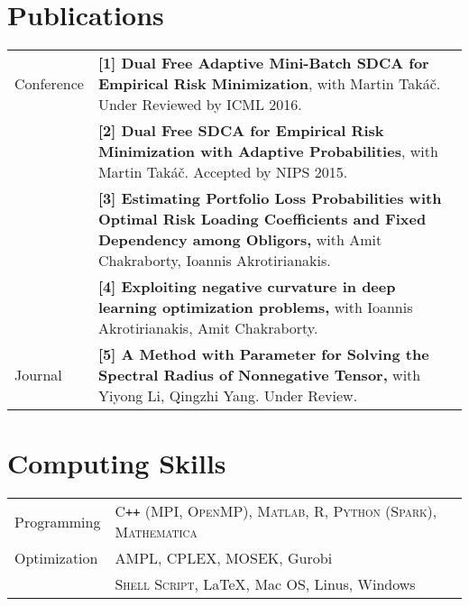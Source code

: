 \documentclass[letters,11pt]{article} %
\begin{document}
\section{Publications}
\begin{longtable}{>{\centering}p{3.3cm}|p{14cm}}
    Conference &
     \textbf{[1] Dual Free Adaptive Mini-Batch SDCA for Empirical Risk Minimization}, with Martin Takáč. Under Reviewed by ICML 2016.\\
    &\textbf{[2] Dual Free SDCA for Empirical Risk Minimization with Adaptive Probabilities}, with Martin Takáč. Accepted by NIPS 2015.\\
    &\textbf{[3] Estimating Portfolio Loss Probabilities with Optimal Risk Loading Coefficients and Fixed Dependency among Obligors,} with Amit Chakraborty, Ioannis Akrotirianakis. \\
        \pagebreak
    &\textbf{[4] Exploiting negative curvature in deep learning optimization problems,} with Ioannis Akrotirianakis, Amit Chakraborty.\\
    Journal &\textbf{[5] A Method with Parameter for Solving the Spectral Radius of Nonnegative Tensor,} with Yiyong Li, Qingzhi Yang. Under Review.
\end{longtable}

\section{Computing Skills}
\begin{longtable}{>{\centering}p{3.3cm}|p{14cm}}
    Programming & \textsc{C\texttt{++} (MPI, OpenMP)}, \textsc{Matlab}, \textsc{R}, \textsc{Python (Spark)}, \textsc{Mathematica}\\
    Optimization & AMPL, CPLEX, MOSEK, Gurobi \\
    {Others} &  \textsc{Shell Script}, \LaTeX, Mac OS, Linus, Windows
\end{longtable}
\end{document}
